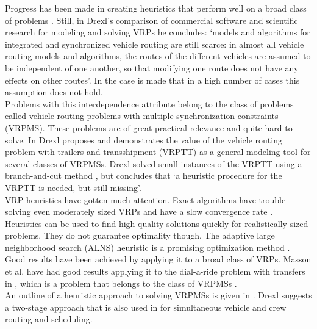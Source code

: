 Progress has been made in creating heuristics that perform well on a broad class of problems \cite{vidal2014unified,pisinger2007general}.
Still, in Drexl's comparison of commercial software and scientific research for modeling and solving VRPs he concludes: `models and algorithms for integrated and synchronized vehicle routing are still scarce: in almost all vehicle routing models and algorithms, the routes of the different vehicles are assumed to be independent of one another, so that modifying one route does not have any effects on other routes'. In \cite{drexl2012rich} the case is made that in a high number of cases this assumption does not hold. \\

Problems with this interdependence attribute belong to the class of problems called vehicle routing problems with multiple synchronization constraints (VRPMS). These problems are of great practical relevance and quite hard to solve. In \cite{drexl2013applications} Drexl proposes and demonstrates the value of the vehicle routing problem with trailers and transshipment (VRPTT) as a general modeling tool for several classes of VRPMSs. Drexl solved small instances of the VRPTT using a branch-and-cut method \cite{drexl2014bandc}, but concludes that `a heuristic procedure for the VRPTT is needed, but still missing'.\\

VRP heuristics have gotten much attention. Exact algorithms have trouble solving even moderately sized VRPs and have a slow convergence rate \cite{cordeau2002guide}. Heuristics can be used to find high-quality solutions quickly for realistically-sized problems. They do not guarantee optimality though.
The adaptive large neighborhood search (ALNS) heuristic is a promising optimization method \cite{pisinger2007general}. Good results have been achieved by applying it to a broad class of VRPs. Masson et al. have had good results applying it to the dial-a-ride problem with transfers in \cite{masson2014dial}, which is a problem that belongs to the class of VRPMSs . \\


An outline of a heuristic approach to solving VRPMSs is given in \cite{drexl2014generic}. Drexl suggests a two-stage approach that is also used in \cite{drexl2013simultaneous} for simultaneous vehicle and crew routing and scheduling.

